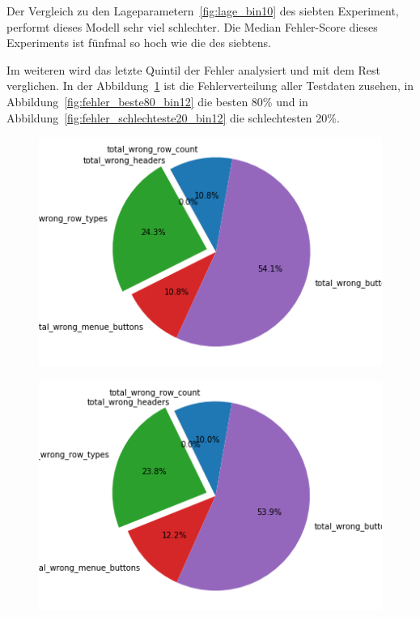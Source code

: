 \documentclass[pdftex,a4paper,halfparskip, article]{scrartcl}
\begin{document}
Der Vergleich zu den Lageparametern~\ref{fig:lage_bin10} des siebten Experiment, performt dieses Modell sehr viel schlechter. Die Median Fehler-Score dieses Experiments ist fünfmal so hoch wie die des siebtens.

Im weiteren wird das letzte Quintil der Fehler analysiert und mit dem Rest verglichen. In der Abbildung~\ref{fig:fehler_gesamt_bin12} ist die Fehlerverteilung aller Testdaten zusehen, in Abbildung~\ref{fig:fehler_beste80_bin12} die besten 80\% und in Abbildung~\ref{fig:fehler_schlechteste20_bin12} die schlechtesten 20\%. 

\begin{figure}
\centering
\begin{minipage}{.33\textwidth}
  \centering
  \includegraphics[width=1\linewidth]{predictions_bin12_total_error_types_pie_chart}
  \label{fig:fehler_gesamt_bin12}
\end{minipage}%
\begin{minipage}{.33\textwidth}
  \centering
  \includegraphics[width=1\linewidth]{predictions_bin12_excluded_p80_error_types_pie_chart}

\end{minipage}
\end{figure}
\end{document}
